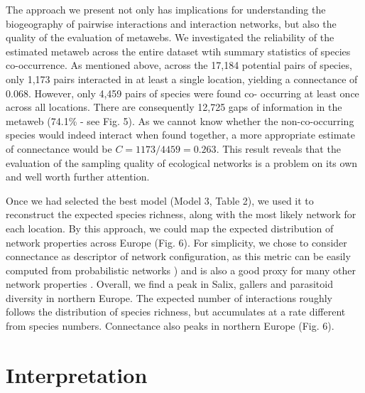 \documentclass[12pt]{article}
\begin{document}
The approach we present not only has implications for understanding the
biogeography of pairwise interactions and interaction networks, but also the
quality of the evaluation of metawebs. We investigated the reliability of the
estimated metaweb across the entire dataset wtih summary statistics of species
co-occurrence. As mentioned above, across the 17,184 potential pairs of
species, only 1,173 pairs interacted in at least a single location, yielding a
connectance of 0.068. However, only 4,459 pairs of species were found co-
occurring at least once across all locations. There are consequently
12,725 gaps of information in the metaweb (74.1\% - see Fig. 5). As we cannot
know whether the non-co-occurring species would indeed interact when found
together, a more appropriate estimate of connectance would be
$C=1173/4459=0.263$. This result reveals that the evaluation of the sampling
quality of ecological networks is a problem on its own and well worth further
attention.

Once we had selected the best model (Model 3, Table 2), we used it to
reconstruct the expected species richness, along with the most likely network
for each location. By this approach, we could map the expected
distribution of network properties across Europe (Fig. 6). For simplicity, we
chose to consider connectance as descriptor of network configuration, as this
metric can be easily computed from probabilistic networks \citep{Poisot2015c}) and is
also a good proxy for many other network properties \citep{Poisot2014}. Overall, we
find a peak in Salix, gallers and parasitoid diversity in northern Europe. The
expected number of interactions roughly follows the distribution of species
richness, but accumulates at a rate different from species numbers.
Connectance also peaks in northern Europe (Fig. 6).

\section*{Interpretation}
\end{document}
